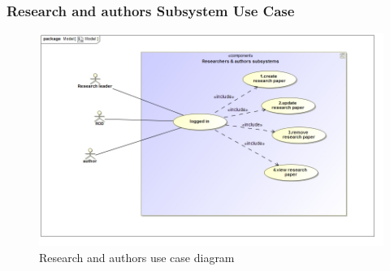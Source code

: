 \documentclass{article}
\begin{document}
			\subsubsection{Research and authors Subsystem Use Case}
				\begin{figure}
					\includegraphics[width=\textwidth]{authorsSubsystem}
					\caption{Research and authors use case diagram}
				\end{figure}
\end{document}
